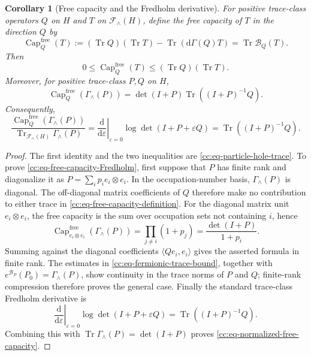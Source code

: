 \documentclass[10pt,reqno]{amsart}
\theoremstyle{plain}
\newtheorem{corollary}[theorem]{Corollary}
\theoremstyle{definition}
\theoremstyle{remark}
\begin{document}
\begin{corollary}[Free capacity and the Fredholm derivative]
\label{cc:cor-free-capacity-Fredholm}
For positive trace-class operators \(Q\) on \(H\) and \(T\) on
\(\mathcal F_{\wedge}(H)\), define the free capacity of \(T\) in the
direction \(Q\) by
\begin{equation}
 \operatorname{Cap}^{\mathrm{free}}_Q(T)
 :=(\operatorname{Tr}Q)(\operatorname{Tr}T)
   -\operatorname{Tr}(\mathrm d\Gamma(Q)T)
 =\operatorname{Tr}\mathcal B_Q(T).
 \label{cc:eq-free-capacity-definition}
\end{equation}
Then
\[
 0\leq\operatorname{Cap}^{\mathrm{free}}_Q(T)
 \leq(\operatorname{Tr}Q)(\operatorname{Tr}T).
\]
Moreover, for positive trace-class \(P,Q\) on \(H\),
\begin{equation}
 \operatorname{Cap}^{\mathrm{free}}_Q(\Gamma_{\wedge}(P))
 =\det(I+P)\operatorname{Tr}((I+P)^{-1}Q).
 \label{cc:eq-free-capacity-Fredholm}
\end{equation}
Consequently,
\begin{equation}
 \frac{\operatorname{Cap}^{\mathrm{free}}_Q(\Gamma_{\wedge}(P))}
      {\operatorname{Tr}_{\mathcal F_{\wedge}(H)}\Gamma_{\wedge}(P)}
 =\left.\frac{\mathrm d}{\mathrm d\varepsilon}\right|_{\varepsilon=0}
   \log\det(I+P+\varepsilon Q)
 =\operatorname{Tr}((I+P)^{-1}Q).
 \label{cc:eq-normalized-free-capacity}
\end{equation}
\end{corollary}

\begin{proof}
The first identity and the two inequalities are
\eqref{cc:eq-particle-hole-trace}.  To prove
\eqref{cc:eq-free-capacity-Fredholm}, first suppose that \(P\) has finite
rank and diagonalize it as \(P=\sum_i p_i e_i\otimes e_i\).  In the
occupation-number basis, \(\Gamma_{\wedge}(P)\) is diagonal.  The
off-diagonal matrix coefficients of \(Q\) therefore make no contribution
to either trace in \eqref{cc:eq-free-capacity-definition}.  For the
diagonal matrix unit \(e_i\otimes e_i\), the free capacity is the sum over
occupation sets not containing \(i\), hence
\[
 \operatorname{Cap}^{\mathrm{free}}_{e_i\otimes e_i}
   (\Gamma_{\wedge}(P))
 =\prod_{j\ne i}(1+p_j)
 =\frac{\det(I+P)}{1+p_i}.
\]
Summing against the diagonal coefficients
\(\langle Qe_i,e_i\rangle\) gives the asserted formula in finite rank.
The estimates in \eqref{cc:eq-fermionic-trace-bound}, together with
\(
 e^{\mathcal B_P}(P_0)=\Gamma_{\wedge}(P)
\), show continuity in the trace norms of \(P\) and \(Q\); finite-rank
compression therefore proves the general case.  Finally the standard
trace-class Fredholm derivative is
\[
 \left.\frac{\mathrm d}{\mathrm d\varepsilon}\right|_{\varepsilon=0}
 \log\det(I+P+\varepsilon Q)
 =\operatorname{Tr}((I+P)^{-1}Q).
\]
Combining this with
\(
 \operatorname{Tr}\Gamma_{\wedge}(P)=\det(I+P)
\)
proves \eqref{cc:eq-normalized-free-capacity}.
\end{proof}
\end{document}
